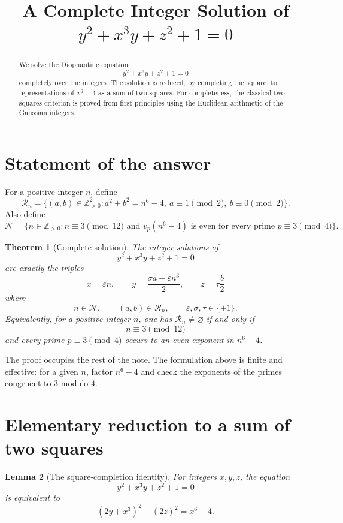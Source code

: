 \documentclass[11pt]{article}
\title{A Complete Integer Solution of\\[3pt]
\texorpdfstring{$y^2+x^3y+z^2+1=0$}{y2+x3y+z2+1=0}}
\author{}
\date{}
\newtheorem{theorem}{Theorem}
\newtheorem{lemma}[theorem]{Lemma}
\theoremstyle{definition}
\theoremstyle{remark}
\newcommand{\Z}{\mathbb Z}
\newcommand{\vp}{v_p}
\begin{document}
\maketitle

\begin{abstract}
We solve the Diophantine equation
\[
        y^2+x^3y+z^2+1=0
\]
completely over the integers.  The solution is reduced, by completing the square, to representations of
$x^6-4$ as a sum of two squares.  For completeness, the classical two-squares criterion is proved from first principles using the Euclidean arithmetic of the Gaussian integers.
\end{abstract}

\section{Statement of the answer}

For a positive integer $n$, define
\[
\mathcal R_n
=
\{(a,b)\in \Z_{>0}^2: a^2+b^2=n^6-4,\ a\equiv 1\pmod 2,\ b\equiv0\pmod2\}.
\]
Also define
\[
\mathcal N
=
\{n\in\Z_{>0}: n\equiv3\pmod {12}\text{ and }\vp(n^6-4)\text{ is even for every prime }p\equiv3\pmod4\}.
\]

\begin{theorem}[Complete solution]
The integer solutions of
\[
        y^2+x^3y+z^2+1=0
\]
are exactly the triples
\[
\boxed{
        x=\varepsilon n,
        \qquad
        y=\frac{\sigma a-\varepsilon n^3}{2},
        \qquad
        z=\tau\frac b2
}
\]
where
\[
        n\in\mathcal N,
        \qquad
        (a,b)\in\mathcal R_n,
        \qquad
        \varepsilon,\sigma,\tau\in\{\pm1\}.
\]
Equivalently, for a positive integer $n$, one has $\mathcal R_n\ne\varnothing$ if and only if
\[
        n\equiv3\pmod {12}
\]
and every prime $p\equiv3\pmod4$ occurs to an even exponent in $n^6-4$.
\end{theorem}

The proof occupies the rest of the note.  The formulation above is finite and effective: for a given $n$, factor $n^6-4$ and check the exponents of the primes congruent to $3$ modulo $4$.

\section{Elementary reduction to a sum of two squares}

\begin{lemma}[The square-completion identity]
For integers $x,y,z$, the equation
\[
        y^2+x^3y+z^2+1=0
\]
is equivalent to
\[
        (2y+x^3)^2+(2z)^2=x^6-4.
\]
\end{lemma}
\end{document}
